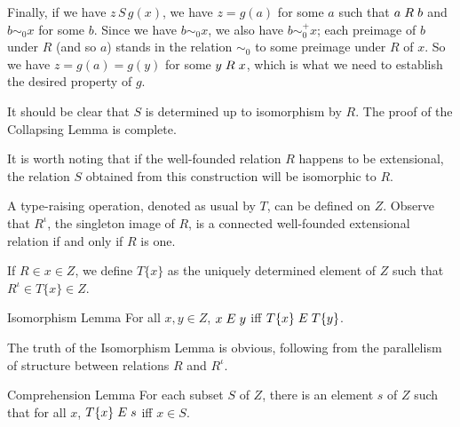 Finally, if we have $z \, S \, g(x)$, we have $z = g(a)$ for some $a$
such that $a \mathrel{R}  b$ and $b \sim_0 x$ for some $b$.  Since we have
$b \sim_0 x$, we also have $b \sim_0^+ x$; each preimage of $b$ under
$R$ (and so $a$) stands in the relation $\sim_0$ to some preimage
under $R$ of $x$.  So we have $z = g(a) = g(y)$ for some $y \mathrel{R}
x$, which is what we need to establish the desired property of $g$.  

It should be clear that $S$ is determined up to isomorphism by $R$.
The proof of the Collapsing Lemma is complete.
\finpreuve

It is worth noting that if the well-founded relation $R$ happens to be
extensional, the relation $S$ obtained from this construction will be
isomorphic to $R$.

A type-raising operation, denoted as
usual by $T$, can be defined on $Z$.  Observe that $R^{\iota}$, the singleton image of $R$, is a
connected well-founded extensional
relation if and
only if $R$ is one.

\begin{definition}
 If $R \in x \in Z$, we define $T\{x\}$ as the 
 uniquely determined element of $Z$ such that $R^{\iota} \in T\{x\} \in Z$.
\end{definition}

\begin{Lemme}{Isomorphism Lemma}
 For all $x,y \in Z$, $x\mathrel{E} y$ iff
 $T\{x\}\mathrel{E} T\{y\}$.
\end{Lemme}

The truth of the Isomorphism Lemma is obvious, following from the
parallelism of structure between relations $R$ and $R^{\iota}$.

\begin{Lemme}{Comprehension Lemma}
 For each subset $S$ of $Z$, there is an
 element $s$ of $Z$ such that for all $x$, $T\{x\}\mathrel{E} s$ iff $x \in S$.
\end{Lemme}

